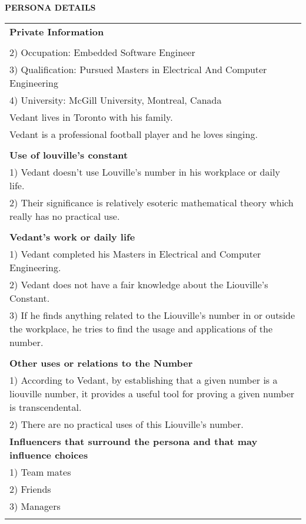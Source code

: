 \documentclass[12pt]{article}
\begin{document}
\newpage
\vspace{\baselineskip}
\begin{rSection}
{\Large \textbf{PERSONA DETAILS}}\vspace{1em}
\end{rSection}
\begin{center}
\begin{tabular}{ | m{40em} | } 
\hline
\textbf{Private Information} \\
\begin{minipage}{0.68\textwidth}
1) Name: Vedant Saini \\
2) Occupation: Embedded Software Engineer\\
3) Qualification: Pursued Masters in Electrical And Computer Engineering\\
4) University: McGill University, Montreal, Canada\\
Vedant lives in Toronto with his family.\\
Vedant is a professional football player and he loves singing.\\
\end{minipage}
\begin{minipage}{0.3\textwidth}
\fbox{\texttt{[image: images/Vedant.jpeg]}}
\end{minipage}
\\
\hline
\textbf{Use of louville's constant} \\
1) Vedant doesn't use Louville's number in his workplace or daily life.\\
2) Their significance is relatively esoteric mathematical theory which really has no practical use.\\
\\
\hline
\textbf{Vedant's work or daily life} \\
1) Vedant completed his Masters in Electrical and Computer Engineering. \\
2) Vedant does not have a fair knowledge about the Liouville's Constant.\\
3) If he finds anything related to the Liouville's number in or outside the workplace, he tries to find the usage and applications of the number.\\
\\
\hline
\textbf{Other uses or relations to the Number} \\
1) According to Vedant, by establishing that a given number is a liouville number, it provides a useful tool for proving a given number is transcendental.\\
2) There are no practical uses of this Liouville's number.
\\
\hline
\textbf{Influencers that surround the persona and that may influence choices} \\
1) Team mates\\
2) Friends\\
3) Managers\\
\\
\hline
\end{tabular}
\end{center}
\end{document}
